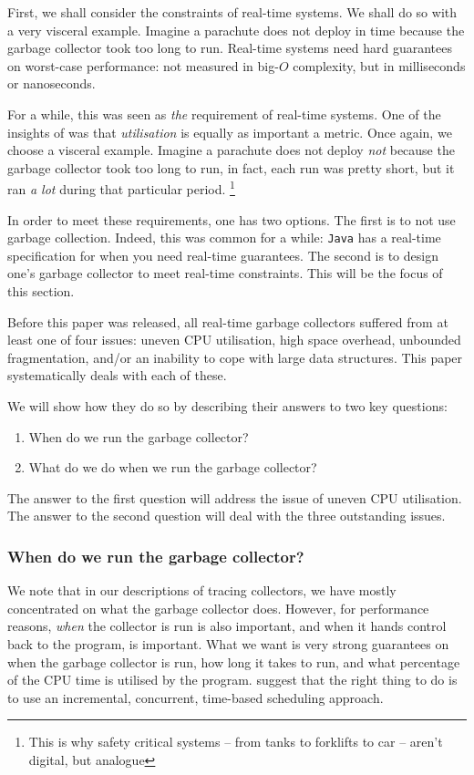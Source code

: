 First, we shall consider the constraints of real-time systems. We shall do so with a very visceral example. Imagine a parachute does not deploy in time because the garbage collector took too long to run. Real-time systems need hard guarantees on worst-case performance: not measured in big-$O$ complexity, but in milliseconds or nanoseconds. 

For a while, this was seen as \textit{the} requirement of real-time systems. One of the insights of \citet{bacon-2003} was that \textit{utilisation} is equally as important a metric. Once again, we choose a visceral example. Imagine a parachute does not deploy \textit{not} because the garbage collector took too long to run, in fact, each run was pretty short, but it ran \textit{a lot} during that particular period. \footnote{This is why safety critical systems -- from tanks to forklifts to car -- aren't digital, but analogue}

In order to meet these requirements, one has two options. The first is to not use garbage collection. Indeed, this was common for a while: \texttt{Java} has a real-time specification for when you need real-time guarantees. The second is to design one's garbage collector to meet real-time constraints. This will be the focus of this section.

Before this paper was released, all real-time garbage collectors suffered from at least one of four issues: uneven CPU utilisation, high space overhead, unbounded fragmentation, and/or an inability to cope with large data structures. This paper systematically deals with each of these.

We will show how they do so by describing their answers to two key questions:
\begin{enumerate}
    \item When do we run the garbage collector?
    \item What do we do when we run the garbage collector?
\end{enumerate}

The answer to the first question will address the issue of uneven CPU utilisation. The answer to the second question will deal with the three outstanding issues.

\subsubsection{When do we run the garbage collector?}
We note that in our descriptions of tracing collectors, we have mostly concentrated on what the garbage collector does. However, for performance reasons, \textit{when} the collector is run is also important, and when it hands control back to the program, is important. What we want is very strong guarantees on when the garbage collector is run, how long it takes to run, and what percentage of the CPU time is utilised by the program. \citet{bacon-2003} suggest that the right thing to do is to use an incremental, concurrent, time-based scheduling approach.

